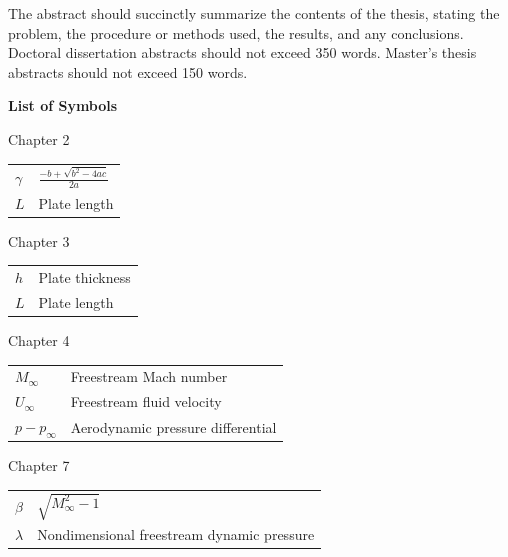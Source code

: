 \documentclass[12pt]{report}
\begin{document}
%
The abstract should succinctly summarize the contents of the thesis, stating the problem, the procedure or methods used, the results, and any conclusions.  Doctoral dissertation abstracts should not exceed 350 words.  Master's thesis abstracts should not exceed 150 words.
%
\newpage
\begin{singlespace}\begin{center}
  \textbf{\Huge{List of Symbols}}
\end{center}

\begin{flushleft}{\large Chapter 2} \end{flushleft}
\begin{tabular}{p{0.75in}l}
   $\gamma$ & $\frac{-b+\sqrt{b^{2}-4ac}}{2a}$\\
   $L$ & {Plate length}\\
\end{tabular}

\begin{flushleft}{\large Chapter 3} \end{flushleft}
\begin{tabular}{p{0.75in}l}
   $h$ & {Plate thickness}\\
   $L$ & {Plate length}\\
\end{tabular}

\begin{flushleft}{\large Chapter 4} \end{flushleft}
\begin{tabular}{p{0.75in}l}
   $M_{\infty}$ & {Freestream Mach number}\\
   $U_{\infty}$ & {Freestream fluid velocity}\\
   $p-p_\infty$ & {Aerodynamic pressure differential}\\
\end{tabular}

\begin{flushleft} {\large Chapter 7} \end{flushleft}
\begin{tabular}{p{0.75in}l}
   $\beta$   & $\sqrt{M_{\infty}^2-1}$\\
   $\lambda$ & {Nondimensional freestream dynamic pressure}\\
\end{tabular}
\end{singlespace}
\end{document}
